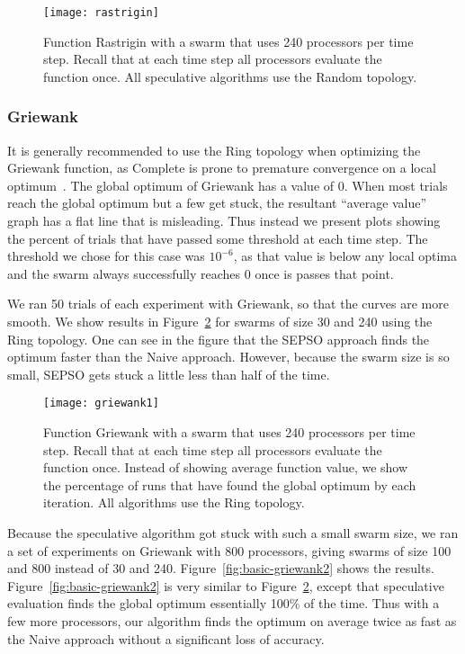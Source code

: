\documentclass[smallcondensed]{svjour3}
\newcommand{\fig}[1]{Figure~\ref{fig:#1}}
\begin{document}
\begin{figure}
  \centering
  \texttt{[image: rastrigin]}
  \caption{Function Rastrigin with a swarm that uses 240 processors per time
  step.  Recall that at each time step all processors evaluate the function
  once.  All speculative algorithms use the Random topology.}
  \label{fig:rastrigin}
\end{figure}

\subsubsection{Griewank}
\label{sec:griewank-20}

It is generally recommended to use the Ring topology when optimizing the
Griewank function, as Complete is prone to premature convergence on a local
optimum~\citep{bratton-2007-defining-a-standard-for-pso}.  The global optimum
of Griewank has a value of 0.  When most trials reach the global optimum but a
few get stuck, the resultant ``average value'' graph has a flat line that is
misleading.  Thus instead we present plots showing the percent of trials that
have passed some threshold at each time step.  The threshold we chose for this
case was $10^{-6}$, as that value is below any local optima and the swarm
always successfully reaches 0 once is passes that point.

We ran 50 trials of each experiment with Griewank, so that the curves are more
smooth.  We show results in \fig{basic-griewank1} for swarms of size 30 and 240
using the Ring topology.  One can see in the figure that the SEPSO approach
finds the optimum faster than the Naive approach.  However, because the swarm
size is so small, SEPSO gets stuck a little less than half of the time.

\begin{figure}
  \centering
  \texttt{[image: griewank1]}
  \caption{Function Griewank with a swarm that uses 240 processors per time
  step.  Recall that at each time step all processors evaluate the function
  once.  Instead of showing average function value, we show the percentage of
  runs that have found the global optimum by each iteration.  All algorithms
  use the Ring topology.}
  \label{fig:basic-griewank1}
\end{figure}

Because the speculative algorithm got stuck with such a small swarm size, we
ran a set of experiments on Griewank with 800 processors, giving swarms of size
100 and 800 instead of 30 and 240.  \fig{basic-griewank2} shows the results.
\fig{basic-griewank2} is very similar to \fig{basic-griewank1}, except that
speculative evaluation finds the global optimum essentially 100\% of the time.
Thus with a few more processors, our algorithm finds the optimum on average
twice as fast as the Naive approach without a significant loss of accuracy.
\end{document}
